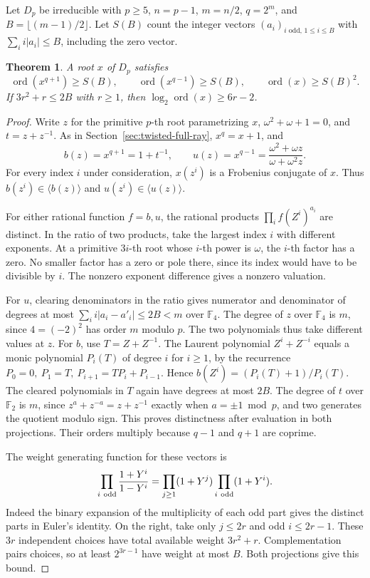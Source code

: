 \documentclass[11pt]{article}
\newtheorem{theorem}{Theorem}
\newcommand{\ord}{\operatorname{ord}}
\begin{document}
Let \(D_p\) be irreducible with \(p\ge5\), \(n=p-1\), \(m=n/2\),
\(q=2^m\), and \(B=\lfloor(m-1)/2\rfloor\). Let \(S(B)\) count
the integer vectors \((a_i)_{i\text{ odd},\,1\le i\le B}\) with
\(\sum_i i|a_i|\le B\), including the zero vector.
\begin{theorem}
A root \(x\) of \(D_p\) satisfies
\[
       \ord(x^{q+1})\ge S(B),\qquad
       \ord(x^{q-1})\ge S(B),\qquad
       \ord(x)\ge S(B)^2.
\]
If \(3r^2+r\le2B\) with \(r\ge1\), then
\(\log_2\ord(x)\ge6r-2\).
\end{theorem}
\begin{proof}
Write \(z\) for the primitive \(p\)-th root parametrizing \(x\),
\(\omega^2+\omega+1=0\), and \(t=z+z^{-1}\).
As in Section~\ref{sec:twisted-full-ray}, \(x^q=x+1\), and
\[
 b(z)=x^{q+1}=1+t^{-1},\qquad
 u(z)=x^{q-1}=\frac{\omega^2+\omega z}{\omega+\omega^2z}.
\]
For every index \(i\) under consideration, \(x(z^i)\) is a
Frobenius conjugate of \(x\). Thus \(b(z^i)\in\langle b(z)\rangle\)
and \(u(z^i)\in\langle u(z)\rangle\).

For either rational function \(f=b,u\), the rational products
\(\prod_i f(Z^i)^{a_i}\) are distinct. In the ratio of two
products, take the largest index \(i\) with different exponents.
At a primitive \(3i\)-th root whose \(i\)-th power is \(\omega\),
the \(i\)-th factor has a zero. No smaller factor has a zero or
pole there, since its index would have to be divisible by \(i\).
The nonzero exponent difference gives a nonzero valuation.

For \(u\), clearing denominators in the ratio gives numerator
and denominator of degrees at most
\(\sum_i i|a_i-a'_i|\le2B<m\) over \(\mathbb F_4\).
The degree of \(z\) over \(\mathbb F_4\) is \(m\),
since \(4=(-2)^2\) has order \(m\) modulo \(p\). The two
polynomials thus take different values at \(z\).
For \(b\), use \(T=Z+Z^{-1}\). The Laurent polynomial
\(Z^i+Z^{-i}\) equals a monic polynomial \(P_i(T)\) of degree
\(i\) for \(i\ge1\), by the recurrence
\(P_0=0,\ P_1=T,\ P_{i+1}=TP_i+P_{i-1}\). Hence
\(b(Z^i)=(P_i(T)+1)/P_i(T)\). The cleared polynomials in \(T\)
again have degrees at most \(2B\). The degree of \(t\) over
\(\mathbb F_2\) is \(m\), since \(z^a+z^{-a}=z+z^{-1}\)
exactly when \(a=\pm1\bmod p\), and two generates the quotient
modulo sign. This proves distinctness after evaluation in both
projections. Their orders multiply because \(q-1\) and \(q+1\)
are coprime.

The weight generating function for these vectors is
\[
 \prod_{i\ {\rm odd}}\frac{1+Y^i}{1-Y^i}
       =\prod_{j\ge1}(1+Y^j)\prod_{i\ {\rm odd}}(1+Y^i).
\]
Indeed the binary expansion of the multiplicity of each odd part
gives the distinct parts in Euler's identity. On the right, take
only \(j\le2r\) and odd \(i\le2r-1\). These \(3r\) independent
choices have total available weight \(3r^2+r\). Complementation
pairs choices, so at least \(2^{3r-1}\) have weight at most \(B\).
Both projections give this bound.
\end{proof}
\end{document}
